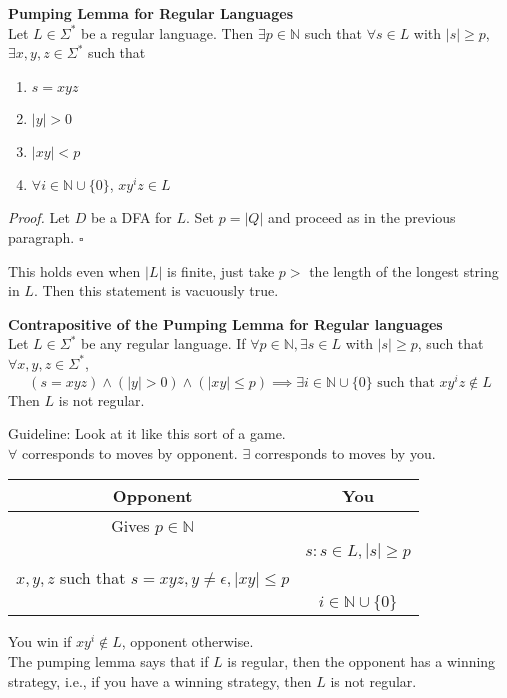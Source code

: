 \documentclass[a4paper]{article}
\newenvironment{proof}{\begin{breakbox}\textit{Proof.}}{\hfill$\square$\end{breakbox}}
\newcommand{\nl}{\vspace{0.2cm}\\}
\newcommand{\mb}{\mathbb}
\begin{document}
\begin{lemma}
    \textbf{Pumping Lemma for Regular Languages}\nl
    Let $L \in \Sigma^*$ be a regular language. Then $\exists p \in \mb{N}$ such that $\forall s \in L$ with $|s| \ge p$, $\exists x, y, z \in \Sigma^*$ such that
    \begin{enumerate}
        \item $s = xyz$
        \item $|y| > 0$
        \item $|xy| < p$
        \item $\forall i \in \mb{N} \cup \{0\}$, $xy^iz \in L$
    \end{enumerate}
\end{lemma}
\begin{proof}
    Let $D$ be a DFA for $L$. Set $p = |Q|$ and proceed as in the previous paragraph.
\end{proof}
\begin{note}
    This holds even when $|L|$ is finite, just take $p > $ the length of the longest string in $L$. Then this statement is vacuously true.
\end{note}
\begin{lemma}
    \textbf{Contrapositive of the Pumping Lemma for Regular languages}\nl
    Let $L \in \Sigma^*$ be any regular language. If $\forall p \in \mb{N}, \exists s \in L$ with $|s| \ge p$, such that $\forall x, y, z \in \Sigma^*$,
    $$
    (s = xyz) \land (|y| > 0) \land (|xy| \le p) \implies \exists i \in \mb{N} \cup \{0\} \text{ such that } xy^iz \not\in L
    $$
    Then $L$ is not regular.
\end{lemma}
\begin{note}
    Guideline: Look at it like this sort of a game.\nl
    $\forall$ corresponds to moves by opponent. $\exists$ corresponds to moves by you.\nl
    \begin{center}
    \begin{tabular}{|c|c|}
        \hline
        Opponent & You  \\
        \hline
        Gives $p \in \mb{N}$ &  \\
        & $s : s \in L, |s| \ge p$ \\
        $x, y, z$ such that $s = xyz, y \ne \epsilon, |xy| \le p$ & \\
        & $i \in \mb{N} \cup \{0\}$\\
        \hline
    \end{tabular}
    \end{center}

    You win if $xy^i \not \in L$, opponent otherwise.\nl

    The pumping lemma says that if $L$ is regular, then the opponent has a winning strategy, i.e., if you have a winning strategy, then $L$ is not regular.
\end{note}
\end{document}
